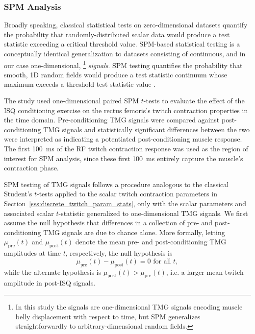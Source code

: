 \documentclass[utf8]{FrontiersinHarvard}
\begin{document}
\subsubsection{SPM Analysis} \label{sss:spm_analysis}
Broadly speaking, classical statistical tests on zero-dimensional datasets quantify the probability that randomly-distributed scalar data would produce a test statistic exceeding a critical threshold value.
SPM-based statistical testing is a conceptually identical generalization to datasets consisting of continuous, and in our case one-dimensional,%
\footnote{In this study the signals are one-dimensional TMG signals encoding muscle belly displacement with respect to time, but SPM generalizes straightforwardly to arbitrary-dimensional random fields.}
\textit{signals}.
SPM testing quantifies the probability that smooth, 1D random fields would produce a test statistic continuum whose maximum exceeds a threshold test statistic value \citep{pataky-spm1d, pataky-roi, pataky}.

The study used one-dimensional paired SPM $ t $-tests to evaluate the effect of the ISQ conditioning exercise on the rectus femoris's twitch contraction properties in the time domain.
Pre-conditioning TMG signals were compared against post-conditioning TMG signals and statistically significant differences between the two were interpreted as indicating a potentiated post-conditioning muscle response.
The first \SI{100}{\milli \second} of the RF twitch contraction response was used as the region of interest for SPM analysis, since these first \SI{100}{\milli \second} entirely capture the muscle's contraction phase.

SPM testing of TMG signals follows a procedure analogous to the classical Student's $ t $-tests applied to the scalar twitch contraction parameters in Section~\ref{sss:discrete_twitch_param_stats}, only with the scalar parameters and associated scalar $ t $-statistic generalized to one-dimensional TMG signals.
We first assume the null hypothesis that differences in a collection of pre- and post-conditioning TMG signals are due to chance alone.
More formally, letting $ \mu_{\mathrm{pre}}(t) $ and $ \mu_{\mathrm{post}}(t) $ denote the mean pre- and post-conditioning TMG amplitudes at time $ t $, respectively, the null hypothesis is
\begin{equation}
    \mu_{\text{pre}}(t) - \mu_{\text{post}} (t) = 0 \text{ for all } t, \label{eq:spm_null_hypothesis}
\end{equation}
while the alternate hypothesis is $ \mu_{\text{post}}(t) > \mu_{\text{pre}}(t) $, i.e. a larger mean twitch amplitude in post-ISQ signals.
\end{document}
